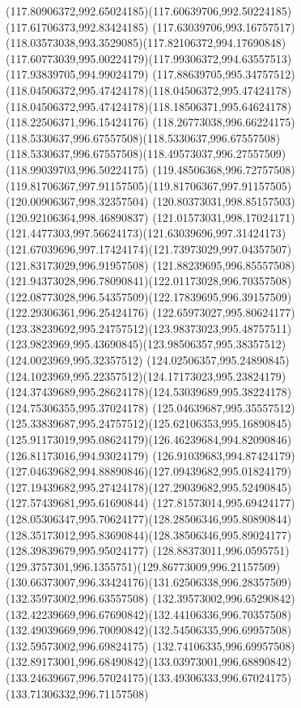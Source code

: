 {{		\curveto(117.80906372,992.65024185)(117.60639706,992.50224185)(117.61706373,992.83424185)
		\curveto(117.63039706,993.16757517)(118.03573038,993.3529085)(117.82106372,994.17690848)
		\curveto(117.60773039,995.00224179)(117.99306372,994.63557513)(117.93839705,994.99024179)
		\curveto(117.88639705,995.34757512)(118.04506372,995.47424178)(118.04506372,995.47424178)
		\curveto(118.04506372,995.47424178)(118.18506371,995.64624178)(118.22506371,996.15424176)
		\curveto(118.26773038,996.66224175)(118.5330637,996.67557508)(118.5330637,996.67557508)
		\curveto(118.5330637,996.67557508)(118.49573037,996.27557509)(118.99039703,996.50224175)
		\curveto(119.48506368,996.72757508)(119.81706367,997.91157505)(119.81706367,997.91157505)
		\lineto(120.00906367,998.32357504)
		\lineto(120.80373031,998.85157503)
		\lineto(120.92106364,998.46890837)
		\curveto(121.01573031,998.17024171)(121.4477303,997.56624173)(121.63039696,997.31424173)
		\curveto(121.67039696,997.17424174)(121.73973029,997.04357507)(121.83173029,996.91957508)
		\curveto(121.88239695,996.85557508)(121.94373028,996.78090841)(122.01173028,996.70357508)
		\curveto(122.08773028,996.54357509)(122.17839695,996.39157509)(122.29306361,996.25424176)
		\curveto(122.65973027,995.80624177)(123.38239692,995.24757512)(123.98373023,995.48757511)
		\curveto(123.9823969,995.43690845)(123.98506357,995.38357512)(124.0023969,995.32357512)
		\curveto(124.02506357,995.24890845)(124.1023969,995.22357512)(124.17173023,995.23824179)
		\curveto(124.37439689,995.28624178)(124.53039689,995.38224178)(124.75306355,995.37024178)
		\curveto(125.04639687,995.35557512)(125.33839687,995.24757512)(125.62106353,995.16890845)
		\curveto(125.91173019,995.08624179)(126.46239684,994.82090846)(126.81173016,994.93024179)
		\curveto(126.91039683,994.87424179)(127.04639682,994.88890846)(127.09439682,995.01824179)
		\curveto(127.19439682,995.27424178)(127.29039682,995.52490845)(127.57439681,995.61690844)
		\curveto(127.81573014,995.69424177)(128.05306347,995.70624177)(128.28506346,995.80890844)
		\curveto(128.35173012,995.83690844)(128.38506346,995.89024177)(128.39839679,995.95024177)
		\curveto(128.88373011,996.0595751)(129.3757301,996.1355751)(129.86773009,996.21157509)
		\curveto(130.66373007,996.33424176)(131.62506338,996.28357509)(132.35973002,996.63557508)
		\curveto(132.39573002,996.65290842)(132.42239669,996.67690842)(132.44106336,996.70357508)
		\curveto(132.49039669,996.70090842)(132.54506335,996.69957508)(132.59573002,996.69824175)
		\curveto(132.74106335,996.69957508)(132.89173001,996.68490842)(133.03973001,996.68890842)
		\curveto(133.24639667,996.57024175)(133.49306333,996.67024175)(133.71306332,996.71157508)
}}
